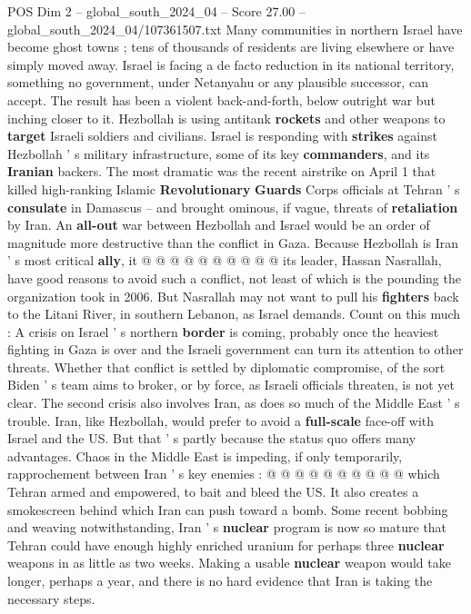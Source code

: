 \begin{textsample}{POS Dim 2 – global\_south\_2024\_04 – Score 27.00 – global\_south\_2024\_04/107361507.txt}
Many communities in northern Israel have become ghost towns ; tens of thousands of residents are living elsewhere or have simply moved away.
Israel is facing a de facto reduction in its national territory, something no government, under Netanyahu or any plausible successor, can accept.
The result has been a violent back-and-forth, below outright war but inching closer to it.
Hezbollah is using antitank \textbf{rockets} and other weapons to \textbf{target} Israeli soldiers and civilians.
Israel is responding with \textbf{strikes} against Hezbollah ' s military infrastructure, some of its key \textbf{commanders}, and its \textbf{Iranian} backers.
The most dramatic was the recent airstrike on April 1 that killed high-ranking Islamic \textbf{Revolutionary} \textbf{Guards} Corps officials at Tehran ' s \textbf{consulate} in Damascus -- and brought ominous, if vague, threats of \textbf{retaliation} by Iran.
An \textbf{all-out} war between Hezbollah and Israel would be an order of magnitude more destructive than the conflict in Gaza.
Because Hezbollah is Iran ' s most critical \textbf{ally}, it @ @ @ @ @ @ @ @ @ @ its leader, Hassan Nasrallah, have good reasons to avoid such a conflict, not least of which is the pounding the organization took in 2006.
But Nasrallah may not want to pull his \textbf{fighters} back to the Litani River, in southern Lebanon, as Israel demands.
Count on this much : A crisis on Israel ' s northern \textbf{border} is coming, probably once the heaviest fighting in Gaza is over and the Israeli government can turn its attention to other threats.
Whether that conflict is settled by diplomatic compromise, of the sort Biden ' s team aims to broker, or by force, as Israeli officials threaten, is not yet clear.
The second crisis also involves Iran, as does so much of the Middle East ' s trouble.
Iran, like Hezbollah, would prefer to avoid a \textbf{full-scale} face-off with Israel and the US.
But that ' s partly because the status quo offers many advantages.
Chaos in the Middle East is impeding, if only temporarily, rapprochement between Iran ' s key enemies : @ @ @ @ @ @ @ @ @ @ which Tehran armed and empowered, to bait and bleed the US.
It also creates a smokescreen behind which Iran can push toward a bomb.
Some recent bobbing and weaving notwithstanding, Iran ' s \textbf{nuclear} program is now so mature that Tehran could have enough highly enriched uranium for perhaps three \textbf{nuclear} weapons in as little as two weeks.
Making a usable \textbf{nuclear} weapon would take longer, perhaps a year, and there is no hard evidence that Iran is taking the necessary steps.

\end{textsample}
